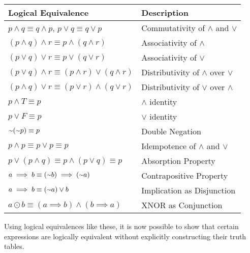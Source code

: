 \begin{table}[h]
\centering
\begin{tabular}{|l|l|}
\hline
Logical Equivalence & Description \\ \hline
$p \land q \equiv q \land p$, $p \lor q \equiv q \lor p$ & Commutativity of $\land$ and $\lor$\\ \hline
$(p \land q) \land r \equiv p \land (q \land r)$ & Associativity of $\land$\\ \hline
$(p \lor q) \lor r \equiv p \lor (q \lor r)$ & Associativity of $\lor$ \\ \hline
$(p \lor q) \land r \equiv (p \land r) \lor (q \land r) $ & Distributivity of $\land$ over $\lor$ \\ \hline
$(p \land q) \lor r \equiv (p \lor r) \land (q \lor r) $ & Distributivity of $\lor$ over $\land$ \\ \hline
$p \land T \equiv p$ & $\land$ identity \\ \hline
$p \lor F \equiv p$ & $\lor$ identity \\ \hline
$\shortsim(\shortsim p) \equiv p$ & Double Negation \\ \hline
$p \land p \equiv p \lor p \equiv p$ & Idempotence of $\land$ and $\lor$ \\ \hline
$p \lor (p \land q) \equiv p \land (p \lor q) \equiv p$ & Absorption Property \\ \hline
$a \implies b \equiv (\shortsim b) \implies (\shortsim a)$ & Contrapositive Property \\ \hline
$a \implies b \equiv (\shortsim a) \lor b$ & Implication as Disjunction \\ \hline
$a \odot b \equiv (a \implies b) \land (b \implies a)$ & XNOR as Conjunction \\ \hline
\end{tabular}
\end{table}

Using logical equivalences like these, it is now possible to show that certain expressions are logically equivalent without explicitly constructing their truth tables.

\begin{example}

\end{example}